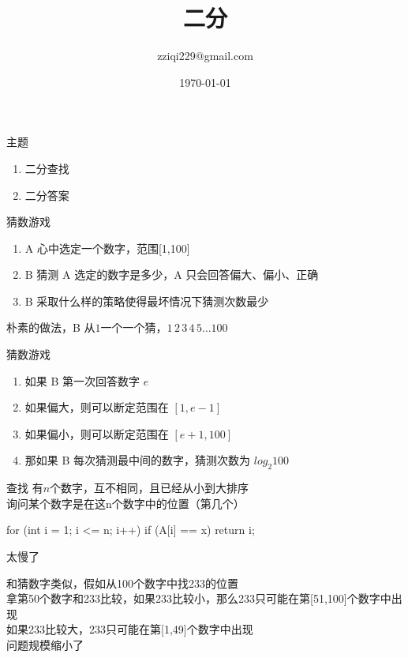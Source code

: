 \documentclass[aspectratio=169,xcolor=dvipsnames]{beamer}
\title[]{二分} %
\author[Ziqi Zhao] {zziqi229@gmail.com}
\institute[NTU] %
{
}
\date{\today} %
\begin{document}
\begin{frame}
    \titlepage
\end{frame}

\begin{frame}{主题}
    \begin{enumerate}
        \item 二分查找
        \item 二分答案
    \end{enumerate}
\end{frame}

\begin{frame}{猜数游戏}
    \begin{enumerate}
        \item A 心中选定一个数字，范围[1,100]
        \item B 猜测 A 选定的数字是多少，A 只会回答偏大、偏小、正确
        \item B 采取什么样的策略使得最坏情况下猜测次数最少
    \end{enumerate}

    \vspace{2.5em}

    朴素的做法，B 从$1$一个一个猜，$1 \, 2 \, 3 \, 4 \, 5 \ldots 100$

\end{frame}

\begin{frame}{猜数游戏}
    \begin{enumerate}
        \item 如果 B 第一次回答数字 $e$
        \item 如果偏大，则可以断定范围在 $[1,e-1]$
        \item 如果偏小，则可以断定范围在 $[e+1,100]$
        \item 那如果 B 每次猜测最中间的数字，猜测次数为 $log_2 100$
    \end{enumerate}
\end{frame}



\begin{frame}[fragile]{查找}
    有$n$个数字，互不相同，且已经从小到大排序\\
    询问某个数字是在这n个数字中的位置（第几个）


    \begin{cppcode}
for (int i = 1; i <= n; i++) {
    if (A[i] == x)
        return i;
}
    \end{cppcode}

    太慢了


    和猜数字类似，假如从100个数字中找233的位置\\
    拿第50个数字和233比较，如果233比较小，那么233只可能在第[51,100]个数字中出现\\
    如果233比较大，233只可能在第[1,49]个数字中出现\\
    问题规模缩小了
\end{frame}
\end{document}
